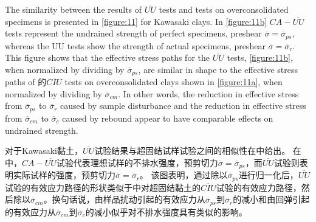 \begin{paracol}{2}
    The similarity between the results of $\overline{UU}$ tests and tests on overconsolidated specimens is presented in \autoref{figure:11} for Kawasaki clays. In \autoref{figure:11b} $CA-\overline{UU}$ tests represent the undrained strength of perfect specimens, preshear $\overline{\sigma}=\overline{\sigma}_{ps}$, whereas the UU tests show the strength of actual specimens, preshear $\overline{\sigma}=\overline{\sigma}_r$. This figure shows that the effective stress paths for the $\overline{UU}$ tests, \autoref{figure:11b}, when normalized by dividing by $\overline{\sigma}_{ps}$, are similar in shape to the effective stress paths of 的$\overline{CIU}$ tests on overconsolidated clays shown in \autoref{figure:11a}, when normalized by dividing by $\overline{\sigma}_{cm}$. In other words, the reduction in effective stress from $\overline{\sigma}_{ps}$ to $\overline{\sigma}_r$ caused by sample disturbance and the reduction in effective stress from $\overline{\sigma}_{cm}$ to $\overline{\sigma}_c$ caused by rebound appear to have comparable effects on undrained strength.

    \switchcolumn
    
    对于Kawasaki黏土，$\overline{UU}$试验结果与超固结试样试验之间的相似性在中给出。 在中，$CA-\overline{UU}$试验代表理想试样的不排水强度，预剪切力$\overline{\sigma}=\overline{\sigma}_{ps}$，而$\overline{UU}$试验则表明实际试样的强度，预剪切力$\overline{\sigma}=\overline{\sigma}_r$。 该图表明，通过除以$\overline{\sigma}_{ps}$进行归一化后，$\overline{UU}$试验的有效应力路径的形状类似于中对超固结黏土的$\overline{CIU}$试验的有效应力路径，然后除以$\overline{\sigma}_{cm}$。换句话说，由样品扰动引起的有效应力从$\overline{\sigma}_{ps}$到$\overline{\sigma}_r$的减小和由回弹引起的有效应力从$\overline{\sigma}_{cm}$到$\overline{\sigma}_c$的减小似乎对不排水强度具有类似的影响。

\end{paracol}



